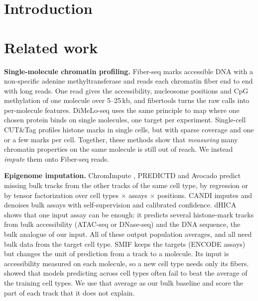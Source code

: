 \documentclass[acmtog,nonacm]{acmart}   %
\begin{document}
\maketitle

\section{Introduction}
\label{sec:intro}

\section{Related work}
\label{sec:related}

\textbf{Single-molecule chromatin profiling.} Fiber-seq \citep{Stergachis20} marks accessible DNA with a
non-specific adenine methyltransferase and reads each chromatin fiber end to end with long reads. One read gives
the accessibility, nucleosome positions and CpG methylation of one molecule over 5--25\,kb, and fibertools
\citep{Jha24} turns the raw calls into per-molecule features. DiMeLo-seq \citep{Altemose22} uses the same principle
to map where one chosen protein binds on single molecules, one target per experiment. Single-cell CUT\&Tag
\citep{Bartosovic21} profiles histone marks in single cells, but with sparse coverage and one or a few marks per
cell. Together, these methods show that \emph{measuring} many chromatin properties on the same molecule is still
out of reach. We instead \emph{impute} them onto Fiber-seq reads.

\textbf{Epigenome imputation.} ChromImpute \citep{Ernst15}, PREDICTD \citep{Durham18} and Avocado
\citep{Schreiber20Avocado} predict missing bulk tracks from the other tracks of the same cell type, by regression
or by tensor factorization over cell types $\times$ assays $\times$ positions. CANDI \citep{Foroozandeh25} imputes
and denoises bulk assays with self-supervision and calibrated confidence. dHICA \citep{Wen24} shows that one input
assay can be enough: it predicts several histone-mark tracks from bulk accessibility (ATAC-seq or DNase-seq) and
the DNA sequence, the bulk analogue of our input. All of these output population averages, and all need bulk data
from the target cell type. SMIF keeps the targets (ENCODE assays) but changes the unit of prediction from a track
to a molecule. Its input is accessibility measured on each molecule, so a new cell type needs only its fibers.
\citet{Schreiber20Pitfall} showed that models predicting across cell types often fail to beat the average of the
training cell types. We use that average as our bulk baseline and score the part of each track that it does not
explain.
\end{document}
